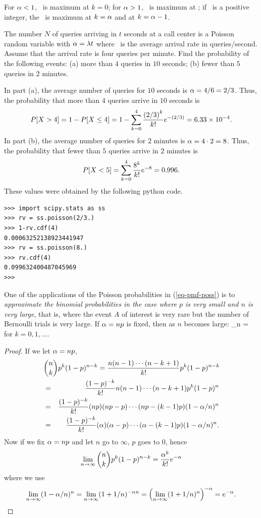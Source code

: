 	\item For $\alpha < 1$, \ is maximum at $k = 0$;
	for $\alpha > 1$, \ is maximum at \floor{\al};
	if \al\ is a positive integer,
	the \ is maximum at $k = \alpha$ and at $k = \alpha - 1$.

	\item {}
	The number $N$ of queries arriving in $t$ seconds at a call center
	is a Poisson random variable with $\alpha = \lambda t$ where \ld\
	is the average arrival rate in queries/second.
	Assume that the arrival rate is four queries per minute.
	Find the probability of the following events:
	(a) more than $4$ queries in $10$ seconds;
	(b) fewer than $5$ queries in $2$ minutes.

	In part (a), the average number of queries for $10$ seconds is $\alpha=4/6=2/3$.
	Thus, the probability that more than $4$ queries arrive in $10$ seconds
	is
	\[
		P[X>4] = 1- P[X\leq 4] = 1-\sum_{k=0}^{4} \frac{{(2/3)}^{k}}{{k}!}e^{-{(2/3)}}
		= 6.33 \times 10^{-4}.
	\]
	In part (b), the average number of queries for $2$ minutes is $\alpha=4\cdot 2=8$.
	Thus, the probability that fewer than $5$ queries arrive in $2$ minutes
	is
	\[
		P[X<5] = \sum_{k=0}^{4} \frac{{8}^{k}}{{k}!}e^{-{8}} = 0.996.
	\]
	These values were obtained by the following python code.
\begin{verbatim}
>>> import scipy.stats as ss
>>> rv = ss.poisson(2/3.)
>>> 1-rv.cdf(4)
0.00063252138923441947
>>> rv = ss.poisson(8.)
>>> rv.cdf(4)
0.099632400487045969
>>>
\end{verbatim}

	\item
	One of the applications of the Poisson probabilities in
	(\ref{eq-pmf-poss}) is
	to \emph{approximate the binomial probabilities in the case where $p$ is very small
	and $n$ is very large},
	that is,
	where the event $A$ of interest is very rare
	but the number of Bernoulli trials is very large.
	If $\alpha = np$ is fixed, then as $n$ becomes large:
		\lim_{n\to\infty}  = 
	\eeql
	for $k=0,1,\ldots$.
	\begin{proof}
	If we let $\alpha=np$,
	\begin{eqnarray*}
		\lefteqn{
			\dbinompmf
			= \frac{n(n-1)\cdots (n-k+1)}{k!} p^k (1-p)^{n-k}
		}
		\\&=&
		\frac{(1-p)^{-k}}{k!}
		n(n-1)\cdots (n-k+1) p^k (1-p)^n
		\\&=&
		\frac{(1-p)^{-k}}{k!}
		(np)(np-p)\cdots (np-(k-1)p) (1-\al/n)^{n}
		\\&=&
		\frac{(1-p)^{-k}}{k!}
		(\al)(\al-p)\cdots (\al-(k-1)p) (1-\al/n)^{n}.
	\end{eqnarray*}
	Now if we fix $\alpha=np$ and let $n$ go to $\infty$,
	$p$ goes to $0$,
	hence
	\[
		\lim_{n \to \infty} {{{n}} \choose {{k}}}{p}^{k}(1-{p})^{{n}-{k}} = \frac{\alpha^k }{k!} e^{-\alpha}
	\]
	where
	we use
	\[
		\lim_{n\to\infty} (1-\alpha/n)^n
		= \lim_{n\to\infty} (1+1/n)^{-\alpha n}
		= \left( \lim_{n\to\infty} (1+1/n)^n \right)^{-\alpha}
		= e^{-\alpha}.
	\]


	\end{proof}

